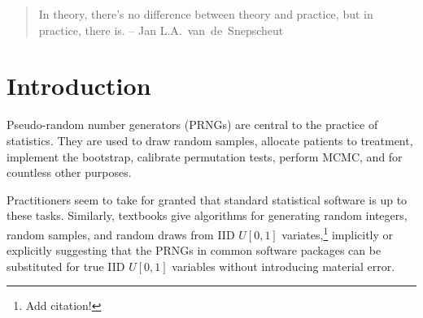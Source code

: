 \documentclass[graybox]{svmult}
\begin{document}
\begin{quotation}
In theory, there's no difference between theory and practice, but in practice, there is. -- Jan L.A.~van~de~Snepscheut
\end{quotation}

\section{Introduction}
\label{sec:introduction}

%
%
%

Pseudo-random number generators (PRNGs) are central to the practice of statistics.
They are used to draw random samples, allocate patients to treatment, implement the bootstrap, 
calibrate permutation tests, perform MCMC, and for countless other purposes.

Practitioners seem to take for granted that standard statistical software is up to these tasks.
Similarly, textbooks give algorithms for generating random integers, random samples,
and random draws from IID $U[0,1]$ variates,\footnote{%
Add citation!
} 
implicitly or explicitly suggesting that
the PRNGs in common software packages can be substituted for true IID $U[0,1]$ variables
without introducing material error.
\end{document}
